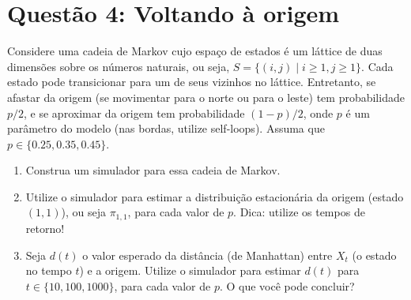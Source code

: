 \section*{Questão 4: Voltando à origem}
Considere uma cadeia de Markov cujo espaço de estados é um láttice de duas dimensões sobre os números naturais, ou seja, $S = \{(i, j) \mid i \geq 1, j \geq 1\}$. Cada estado pode transicionar para um de seus vizinhos no láttice. Entretanto, se afastar da origem (se movimentar para o norte ou para o leste) tem probabilidade $p/2$, e se aproximar da origem tem probabilidade $(1-p)/2$, onde $p$ é um parâmetro do modelo (nas bordas, utilize self-loops). Assuma que $p \in \{0.25, 0.35, 0.45\}$.

\begin{enumerate}
    \item Construa um simulador para essa cadeia de Markov.
    \item Utilize o simulador para estimar a distribuição estacionária da origem (estado $(1,1)$), ou seja $\pi_{1,1}$, para cada valor de $p$. Dica: utilize os tempos de retorno!
    \item Seja $d(t)$ o valor esperado da distância (de Manhattan) entre $X_t$ (o estado no tempo $t$) e a origem. Utilize o simulador para estimar $d(t)$ para $t \in \{10, 100, 1000\}$, para cada valor de $p$. O que você pode concluir?
\end{enumerate}